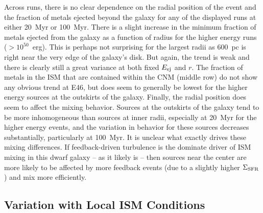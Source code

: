 Across runs, there is no clear dependence on the radial position of the event and the fraction of metals ejected beyond the galaxy for any of the displayed runs at either 20~Myr or 100~Myr. There is a slight increase in the minimum fraction of metals ejected from the galaxy as a function of radius for the higher energy runs ($>10^{50}$~erg). This is perhaps not surprising for the largest radii as 600~pc is right near the very edge of the galaxy's disk. But again, the trend is weak and there is clearly still a great variance at both fixed $E_{\rm ej}$ and $r$. The fraction of metals in the ISM that are contained within the CNM (middle row) do not show any obvious trend at E46, but does seem to generally be lowest for the higher energy sources at the outskirts of the galaxy. Finally, the radial position does seem to affect the mixing behavior. Sources at the outskirts of the galaxy tend to be more inhomogeneous than sources at inner radii, especially at 20~Myr for the higher energy events, and the variation in behavior for these sources decreases substantially, particularly at 100~Myr. It is unclear what exactly drives these mixing differences. If feedback-driven turbulence is the dominate driver of ISM mixing in this dwarf galaxy -- as it likely is -- then sources near the center are more likely to be affected by more feedback events (due to a slightly higher $\Sigma_{\rm SFR}$) and mix more efficiently.

\subsection{Variation with Local ISM Conditions}
\label{ch4:sec:ISM density}

